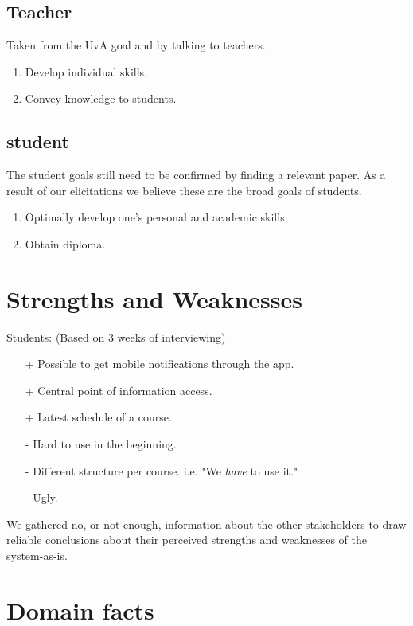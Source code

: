 \subsection{Teacher}
Taken from the UvA goal and by talking to teachers.
\begin{enumerate}
	\item Develop individual skills.
	\item Convey knowledge to students.
\end{enumerate}

\subsection{student}
The student goals still need to be confirmed by finding a relevant paper. As a result of our elicitations we believe these are the broad goals of students.
\begin{enumerate}
	\item Optimally develop one's personal and academic skills.	
	\item Obtain diploma.
\end{enumerate}

\section{Strengths and Weaknesses}
Students: (Based on 3 weeks of interviewing)
\begin{itemize}
	\item[+] Possible to get mobile notifications through the app.
    \item[+] Central point of information access.
	\item[+] Latest schedule of a course.
	\item[-] Hard to use in the beginning.
	\item[-] Different structure per course.
  i.e. "We \textit{have} to use it."
	\item[-] Ugly.
\end{itemize}

We gathered no, or not enough, information about the other stakeholders to draw reliable conclusions about their perceived strengths and weaknesses of the system-as-is.
                               
\section{Domain facts}


